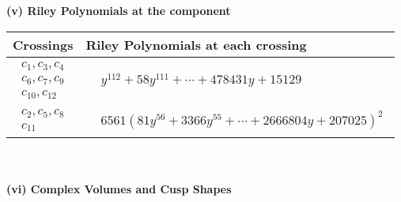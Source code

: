\documentclass[1p]{elsarticle_modified}
\theoremstyle{definition}
\begin{document}
\newpage\renewcommand{\arraystretch}{1}
\flushleft \textbf{(v) Riley Polynomials at the component}\newline \\
\begin{tabular}{m{50pt}|m{274pt}}
Crossings & \hspace{64pt}Riley Polynomials at each crossing \\
\hline $$\begin{aligned}c_{1},c_{3},c_{4}\\c_{6},c_{7},c_{9}\\c_{10},c_{12}\end{aligned}$$&$\begin{aligned}
&y^{112}+58 y^{111}+\cdots+478431 y+15129
\end{aligned}$\\
\hline $$\begin{aligned}c_{2},c_{5},c_{8}\\c_{11}\end{aligned}$$&$\begin{aligned}
&6561(81 y^{56}+3366 y^{55}+\cdots+2666804 y+207025)^{2}
\end{aligned}$\\
\hline
\end{tabular}\\~\\
\newpage\flushleft \textbf{(vi) Complex Volumes and Cusp Shapes}
\end{document}
